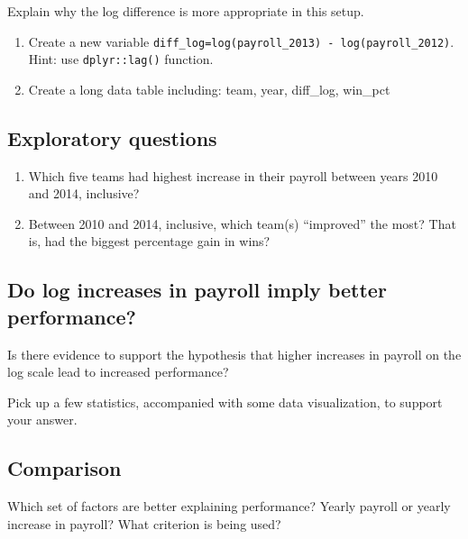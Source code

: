 \documentclass[
]{article}
\begin{document}
Explain why the log difference is more appropriate in this setup.

\begin{enumerate}
\def\labelenumi{\roman{enumi}.}
\setcounter{enumi}{1}
\item
  Create a new variable
  \texttt{diff\_log=log(payroll\_2013)\ -\ log(payroll\_2012)}. Hint:
  use \texttt{dplyr::lag()} function.
\item
  Create a long data table including: team, year, diff\_log, win\_pct
\end{enumerate}

\hypertarget{exploratory-questions}{%
\subsection{Exploratory questions}\label{exploratory-questions}}

\begin{enumerate}
\def\labelenumi{\roman{enumi}.}
\item
  Which five teams had highest increase in their payroll between years
  2010 and 2014, inclusive?
\item
  Between 2010 and 2014, inclusive, which team(s) ``improved'' the most?
  That is, had the biggest percentage gain in wins?
\end{enumerate}

\hypertarget{do-log-increases-in-payroll-imply-better-performance}{%
\subsection{Do log increases in payroll imply better
performance?}\label{do-log-increases-in-payroll-imply-better-performance}}

Is there evidence to support the hypothesis that higher increases in
payroll on the log scale lead to increased performance?

Pick up a few statistics, accompanied with some data visualization, to
support your answer.

\hypertarget{comparison}{%
\subsection{Comparison}\label{comparison}}

Which set of factors are better explaining performance? Yearly payroll
or yearly increase in payroll? What criterion is being used?
\end{document}
